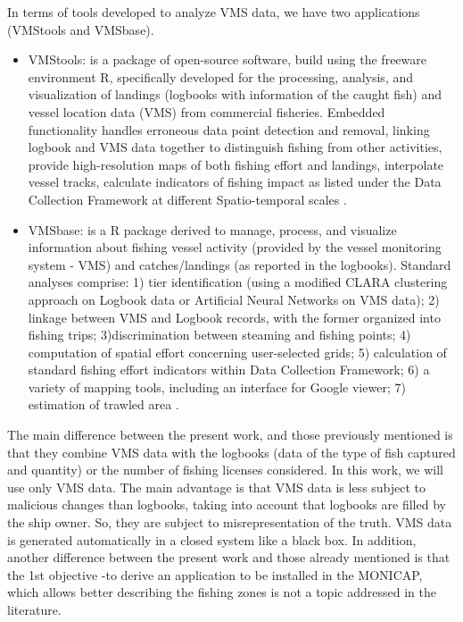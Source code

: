 In terms of tools developed to analyze VMS data, we have two applications (VMStools and VMSbase).
\begin{itemize}
\item VMStools: is a package of open-source software, build using the freeware environment R, specifically developed for the processing, analysis, and visualization of landings (logbooks with information of the caught fish) and vessel location data (VMS) from commercial fisheries. Embedded functionality handles erroneous data point detection and removal, linking logbook and VMS data together to distinguish fishing from other activities, provide high-resolution maps of both fishing effort and landings, interpolate vessel tracks, calculate indicators of fishing impact as listed under the Data Collection Framework at different Spatio-temporal scales \cite{DeporteVMStools}.

\item VMSbase: is a R package derived to manage, process, and visualize information about fishing vessel activity (provided by the vessel monitoring system - VMS) and catches/landings (as reported in the logbooks).
Standard analyses comprise: 1) tier identification (using a modified CLARA clustering approach on Logbook data or Artificial Neural
Networks on VMS data); 2) linkage between VMS and Logbook records, with the former organized into fishing trips; 3)discrimination between steaming and fishing points; 4) computation of spatial effort concerning user-selected grids; 5) calculation of standard fishing effort indicators within Data Collection Framework; 6) a variety of mapping tools, including an interface for Google viewer; 7) estimation of trawled area \cite{RussoVMSbase}.
\end{itemize}

The main difference between the present work, and those previously mentioned is that they combine VMS data with the logbooks (data of the type of fish captured and quantity) or the number of fishing licenses considered. 
In this work, we will use only VMS data. 
The main advantage is that VMS data is less subject to malicious changes than  logbooks, taking into account that logbooks are filled by the ship owner. So, they are subject to misrepresentation of the truth. VMS data is generated automatically in a closed system like a black box. 
In addition, another difference between the present work and those already mentioned is that the 1st objective -to derive an application to be installed in the MONICAP, which allows better describing the fishing zones is not a topic addressed in the literature.
\raggedbottom

